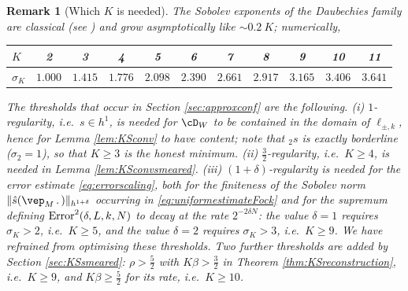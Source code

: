 \documentclass[a4paper, 11pt]{article}
\DeclareMathOperator{\1}{\mathds{1}}
\newtheorem{rem}[thm]{Remark}
\begin{document}
\begin{rem}[Which $K$ is needed]
\label{rem:regularityvalues}
The Sobolev exponents of the Daubechies family are classical (see \cite[Sec.~7.1]{DaubechiesTenLecturesOn}) and grow asymptotically like $\sim0.2\!\ K$; numerically,
\begin{center}
\begin{tabular}{l|cccccccccc}
$K$ & 2 & 3 & 4 & 5 & 6 & 7 & 8 & 9 & 10 & 11 \\ \hline
$\sigma_{K}$ & $1.000$ & $1.415$ & $1.776$ & $2.098$ & $2.390$ & $2.661$ & $2.917$ & $3.165$ & $3.406$ & $3.641$
\end{tabular}
\end{center}
The thresholds that occur in Section \ref{sec:approxconf} are the following. \emph{(i)} $1$-regularity, i.e.~$s\in h^{1}$, is needed for $\cD_{W}$ to be contained in the domain of $\ell_{\pm,k}$, hence for Lemma \ref{lem:KSconv} to have content; note that $_{2}s$ is exactly borderline ($\sigma_{2}=1$), so that $K\geq3$ is the honest minimum. \emph{(ii)} $\tfrac{3}{2}$-regularity, i.e.~$K\geq4$, is needed in Lemma \ref{lem:KSconvsmeared}. \emph{(iii)} $(1+\delta)$-regularity is needed for the error estimate \eqref{eq:errorscaling}, both for the finiteness of the Sobolev norm $\|\hat{s}(\vep_{M}\!\ .\!\ )\|_{h^{1+\delta}}$ occurring in \eqref{eq:uniformestimateFock} and for the supremum defining $\textup{Error}^{2}(\delta,L,k,N)$ to decay at the rate $2^{-2\delta N}$: the value $\delta=1$ requires $\sigma_{K}>2$, i.e.~$K\geq5$, and the value $\delta=2$ requires $\sigma_{K}>3$, i.e.~$K\geq9$. We have refrained from optimising these thresholds. Two further thresholds are added by Section \ref{sec:KSsmeared}: $\rho>\tfrac{5}{2}$ with $K\beta>\tfrac{3}{2}$ in Theorem \ref{thm:KSreconstruction}, i.e.~$K\geq9$, and $K\beta\geq\tfrac{5}{2}$ for its rate, i.e.~$K\geq10$.


\end{rem}
\end{document}

